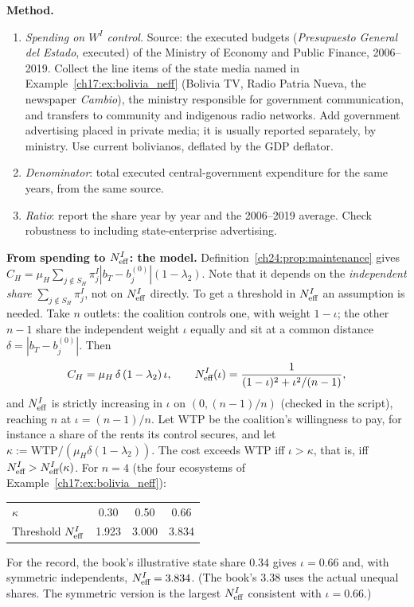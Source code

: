 \documentclass[../solutions_manual.tex]{subfiles}
\begin{document}
 \textbf{Method.}
\begin{enumerate}
\item \emph{Spending on $W^I$ control.} Source: the executed budgets (\emph{Presupuesto General del Estado}, executed) of the Ministry of Economy and Public Finance, 2006--2019. Collect the line items of the state media named in Example~\ref{ch17:ex:bolivia_neff} (Bolivia TV, Radio Patria Nueva, the newspaper \textit{Cambio}), the ministry responsible for government communication, and transfers to community and indigenous radio networks. Add government advertising placed in private media; it is usually reported separately, by ministry. Use current bolivianos, deflated by the GDP deflator.
\item \emph{Denominator}: total executed central-government expenditure for the same years, from the same source.
\item \emph{Ratio}: report the share year by year and the 2006--2019 average. Check robustness to including state-enterprise advertising.
\end{enumerate}

 \textbf{From spending to $N_{\text{eff}}^I$: the model.} Definition~\ref{ch24:prop:maintenance} gives $C_H = \mu_H\sum_{j\notin S_H}\pi^I_j|b_T - b^{(0)}_j|(1-\lambda_2)$. Note that it depends on the \emph{independent share} $\sum_{j\notin S_H}\pi_j^I$, not on $N_{\text{eff}}^I$ directly. To get a threshold in $N_{\text{eff}}^I$ an assumption is needed. Take $n$ outlets: the coalition controls one, with weight $1-\iota$; the other $n-1$ share the independent weight $\iota$ equally and sit at a common distance $\delta = |b_T - b^{(0)}_j|$. Then
\[
C_H = \mu_H\,\delta\,(1-\lambda_2)\,\iota, \qquad N_{\text{eff}}^I(\iota) = \frac{1}{(1-\iota)^2 + \iota^2/(n-1)},
\]
and $N_{\text{eff}}^I$ is strictly increasing in $\iota$ on $(0, (n-1)/n)$ (checked in the script), reaching $n$ at $\iota = (n-1)/n$. Let WTP be the coalition's willingness to pay, for instance a share of the rents its control secures, and let $\kappa := \text{WTP}/(\mu_H\delta(1-\lambda_2))$. The cost exceeds WTP iff $\iota > \kappa$, that is, iff $N_{\text{eff}}^I > N_{\text{eff}}^I(\kappa)$. For $n = 4$ (the four ecosystems of Example~\ref{ch17:ex:bolivia_neff}):
\begin{center}
\begin{tabular}{lccc}
\toprule
$\kappa$ & 0.30 & 0.50 & 0.66 \\
Threshold $N_{\text{eff}}^I$ & 1.923 & 3.000 & 3.834 \\
\bottomrule
\end{tabular}
\end{center}
For the record, the book's illustrative state share $0.34$ gives $\iota = 0.66$ and, with symmetric independents, $N_{\text{eff}}^I = 3.834$. (The book's $3.38$ uses the actual unequal shares. The symmetric version is the largest $N_{\text{eff}}^I$ consistent with $\iota = 0.66$.)
\end{document}
